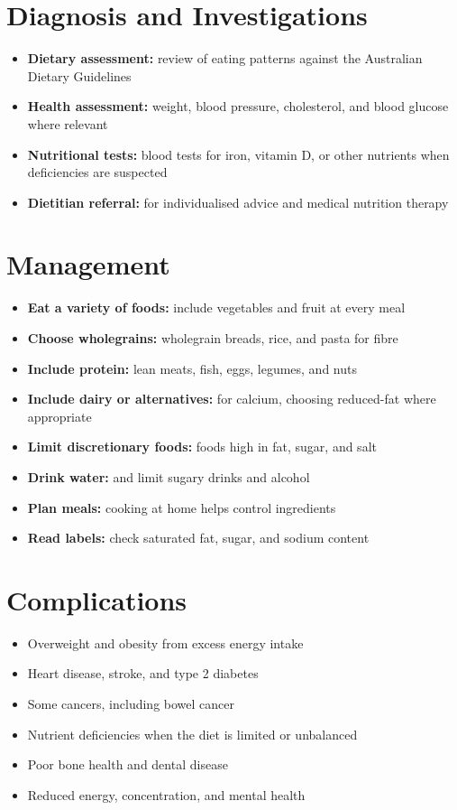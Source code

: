 \section*{Diagnosis and Investigations}
\begin{itemize}
    \item \textbf{Dietary assessment:} review of eating patterns against the Australian Dietary Guidelines
    \item \textbf{Health assessment:} weight, blood pressure, cholesterol, and blood glucose where relevant
    \item \textbf{Nutritional tests:} blood tests for iron, vitamin D, or other nutrients when deficiencies are suspected
    \item \textbf{Dietitian referral:} for individualised advice and medical nutrition therapy
\end{itemize}

\section*{Management}
\begin{itemize}
    \item \textbf{Eat a variety of foods:} include vegetables and fruit at every meal
    \item \textbf{Choose wholegrains:} wholegrain breads, rice, and pasta for fibre
    \item \textbf{Include protein:} lean meats, fish, eggs, legumes, and nuts
    \item \textbf{Include dairy or alternatives:} for calcium, choosing reduced-fat where appropriate
    \item \textbf{Limit discretionary foods:} foods high in fat, sugar, and salt
    \item \textbf{Drink water:} and limit sugary drinks and alcohol
    \item \textbf{Plan meals:} cooking at home helps control ingredients
    \item \textbf{Read labels:} check saturated fat, sugar, and sodium content
\end{itemize}

\section*{Complications}
\begin{itemize}
    \item Overweight and obesity from excess energy intake
    \item Heart disease, stroke, and type 2 diabetes
    \item Some cancers, including bowel cancer
    \item Nutrient deficiencies when the diet is limited or unbalanced
    \item Poor bone health and dental disease
    \item Reduced energy, concentration, and mental health
\end{itemize}

